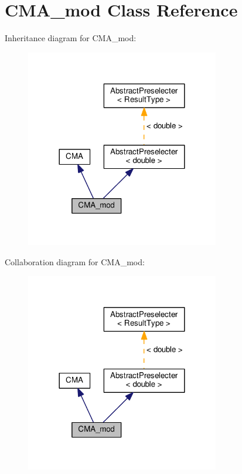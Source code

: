 \hypertarget{classCMA__mod}{}\section{C\+M\+A\+\_\+mod Class Reference}
\label{classCMA__mod}


Inheritance diagram for C\+M\+A\+\_\+mod\+:\nopagebreak
\begin{figure}[H]
\begin{center}
\leavevmode
\includegraphics[width=240pt]{classCMA__mod__inherit__graph}
\end{center}
\end{figure}


Collaboration diagram for C\+M\+A\+\_\+mod\+:\nopagebreak
\begin{figure}[H]
\begin{center}
\leavevmode
\includegraphics[width=240pt]{classCMA__mod__coll__graph}
\end{center}
\end{figure}
